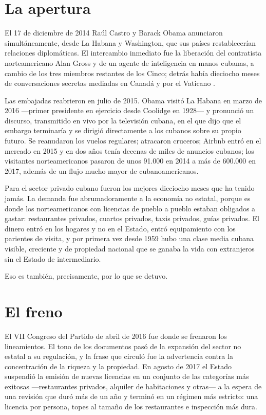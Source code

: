 \section{La apertura}

El 17 de diciembre de 2014 Raúl Castro y Barack Obama anunciaron simultáneamente,
desde La Habana y Washington, que sus países restablecerían relaciones
diplomáticas. El intercambio inmediato fue la liberación del contratista
norteamericano Alan Gross y de un agente de inteligencia en manos cubanas, a
cambio de los tres miembros restantes de los Cinco; detrás había dieciocho meses
de conversaciones secretas mediadas en Canadá y por el Vaticano
\citep{leogrande2014}.

Las embajadas reabrieron en julio de 2015. Obama visitó La Habana en marzo de 2016
---primer presidente en ejercicio desde Coolidge en 1928--- y pronunció un
discurso, transmitido en vivo por la televisión cubana, en el que dijo que el
embargo terminaría y se dirigió directamente a los cubanos sobre su propio futuro.
Se reanudaron los vuelos regulares; atracaron cruceros; Airbnb entró en el mercado
en 2015 y en dos años tenía decenas de miles de anuncios cubanos; los visitantes
norteamericanos pasaron de unos 91.000 en 2014 a más de 600.000 en 2017, además de
un flujo mucho mayor de cubanoamericanos.\unv{}

Para el sector privado cubano fueron los mejores dieciocho meses que ha tenido
jamás. La demanda fue abrumadoramente a la economía no estatal, porque es donde
los norteamericanos con licencias de pueblo a pueblo estaban obligados a gastar:
restaurantes privados, cuartos privados, taxis privados, guías privados. El dinero
entró en los hogares y no en el Estado, entró equipamiento con los parientes de
visita, y por primera vez desde 1959 hubo una clase media cubana visible,
creciente y de propiedad nacional que se ganaba la vida con extranjeros sin el
Estado de intermediario.

Eso es también, precisamente, por lo que se detuvo.

\section{El freno}

El VII Congreso del Partido de abril de 2016 fue donde se frenaron los
lineamientos. El tono de los documentos pasó de la expansión del sector no estatal
a su regulación, y la frase que circuló fue la advertencia contra la concentración
de la riqueza y la propiedad. En agosto de 2017 el Estado suspendió la emisión de
nuevas licencias en un conjunto de las categorías más exitosas ---restaurantes
privados, alquiler de habitaciones y otras--- a la espera de una revisión que duró
más de un año y terminó en un régimen más estricto: una licencia por persona,
topes al tamaño de los restaurantes e inspección más dura.

